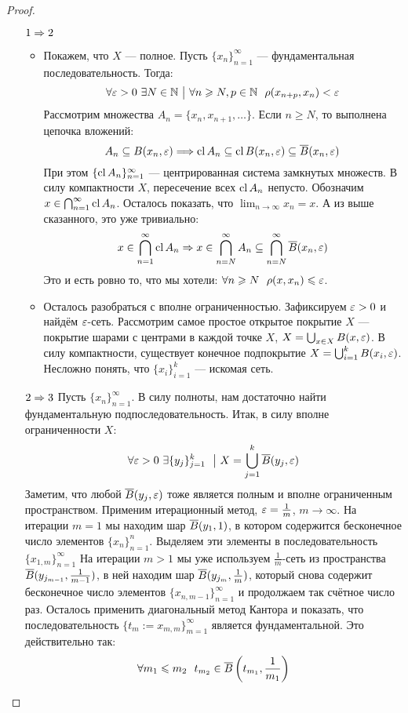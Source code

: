 \begin{proof}~
	\begin{enumerate}
		\item[$1 \Rightarrow 2$] 
		\begin{itemize}
			\item Покажем, что $X$ --- полное. Пусть $\{x_n\}_{n = 1}^\infty$ --- фундаментальная последовательность. Тогда:
			\[
				\forall \varepsilon > 0\ \exists N \in \mathbb{N} \ \big|\  \forall n \geqslant N, p \in \mathbb{N}\ \ \rho(x_{n + p}, x_n) < \varepsilon
			\]
			Рассмотрим множества $A_n = \{x_n, x_{n + 1}, \ldots\}$. Если $n \ge N$, то выполнена цепочка вложений:
			\[
				A_n \subseteq B(x_n, \varepsilon) \Longrightarrow \operatorname{cl} A_n \subseteq \operatorname{cl} B(x_n, \varepsilon) \subseteq \overline{B}(x_n, \varepsilon)
			\]
			При этом $\{\operatorname{cl} A_n\}_{n = 1}^\infty$ --- центрированная система замкнутых множеств. В силу компактности $X$, пересечение всех $\operatorname{cl} A_n$ непусто. Обозначим $x \in \bigcap_{n = 1}^\infty \operatorname{cl} A_n$. Осталось показать, что $\lim_{n \to \infty} x_n = x$. А из выше сказанного, это уже тривиально:
			\[
				x \in \bigcap_{n = 1}^\infty \operatorname{cl} A_n \Rightarrow x \in \bigcap_{n = N}^\infty A_n \subseteq \bigcap_{n = N}^\infty \overline{B}(x_n, \varepsilon)
			\]
			Это и есть ровно то, что мы хотели: $\forall n \ge N\ \ \rho(x, x_n) \le \eps$.
			
			\item Осталось разобраться с вполне ограниченностью. Зафиксируем $\varepsilon > 0$ и найдём $\varepsilon$-сеть. Рассмотрим самое простое открытое покрытие $X$ --- покрытие шарами с центрами в каждой точке $X$, $X = \bigcup_{x \in X} B(x, \varepsilon)$. В силу компактности, существует конечное подпокрытие $X = \bigcup_{i = 1}^k B(x_i, \varepsilon)$. Несложно понять, что $\{x_i\}_{i = 1}^k$ --- искомая сеть.
		\end{itemize}
	
		\item[$2 \Rightarrow 3$] Пусть $\{x_n\}_{n = 1}^\infty$. В силу полноты, нам достаточно найти фундаментальную подпоследовательность.  Итак, в силу вполне ограниченности $X$:
		\[
			\forall \varepsilon > 0\ \exists \{y_j\}_{j = 1}^k\ \ \big|\  X = \bigcup_{j = 1}^k \overline{B}(y_j, \varepsilon)
		\]
		Заметим, что любой $\overline{B}(y_j, \varepsilon)$ тоже является полным и вполне ограниченным пространством. Применим итерационный метод, $\varepsilon = \frac{1}{m}$, $m \to \infty$. На итерации $m = 1$ мы находим шар $\overline{B}(y_1, 1)$, в котором содержится бесконечное число элементов $\{x_n\}_{n = 1}^n$. Выделяем эти элементы в последовательность $\{x_{1, m}\}_{n = 1}^\infty$  На итерации $m > 1$ мы уже используем $\frac{1}{m}$-сеть из пространства $\overline{B}(y_{j_{m - 1}}, \frac{1}{m - 1})$, в ней находим шар $\overline{B}(y_{j_m}, \frac{1}{m})$, который снова содержит бесконечное число элементов $\{x_{n, m - 1}\}_{n = 1}^\infty$ и продолжаем так счётное число раз. Осталось применить диагональный метод Кантора и показать, что последовательность $\{t_m := x_{m, m}\}_{m = 1}^\infty$ является фундаментальной. Это действительно так:
		\[
			\forall m_1 \leqslant m_2\ \ t_{m_2} \in \overline{B}\left(t_{m_1}, \frac{1}{m_1}\right)
		\]
		

\end{enumerate}
\end{proof}
